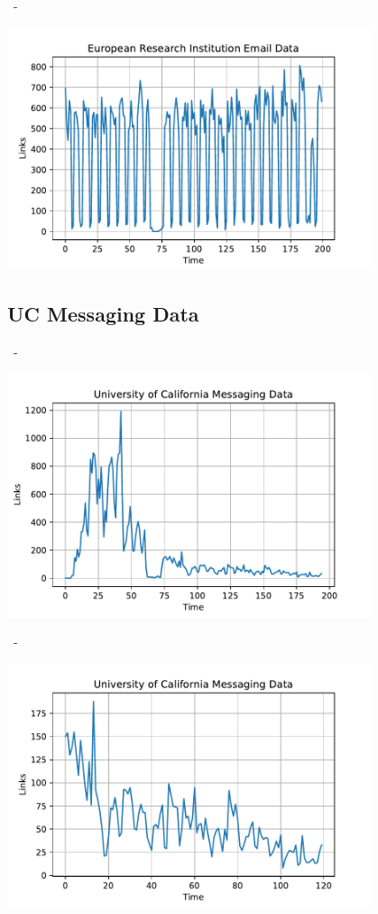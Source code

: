 \documentclass{beamer}
\newenvironment{xframe}
    {\begin{frame}{
        \ifx\insertsubsection\empty
            \strut
        \else\ifx\insertsubsubsection\empty
            \insertsection
        \else
            \insertsection~-~\insertsubsection
        \fi\fi
    }{
        \ifx\insertsubsection\empty
            \insertsection
        \else\ifx\insertsubsubsection\empty
            \insertsubsection
        \else
            \insertsubsubsection
        \fi\fi
    }}
    {\end{frame}}
\begin{document}
    \begin{xframe}
        \centering
        \includegraphics[width=0.8\textwidth]{contents/figures/Data/EUEmail/Links0-200}
    \end{xframe}
    
    \subsection{UC Messaging Data}
    
    \begin{xframe}
        \centering
        \includegraphics[width=0.8\textwidth]{contents/figures/Data/UCMessaging/Links}
    \end{xframe}
    
    \begin{xframe}
        \centering
        \includegraphics[width=0.8\textwidth]{contents/figures/Data/UCMessaging/Links75-195}
    \end{xframe}
    
\end{document}
